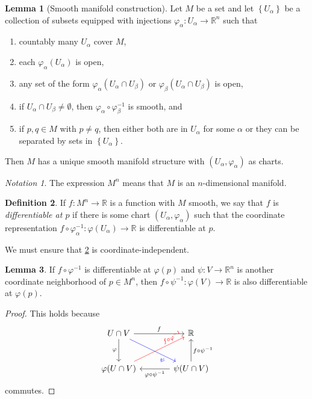 \documentclass[10pt,letterpaper,cm]{nupset}
\theoremstyle{definition}
\newtheorem{definition}{Definition}[subsection]
\theoremstyle{theorem}
\newtheorem{lemma}[definition]{Lemma}
\theoremstyle{remark}
\newtheorem*{notation}{Notation}
\newcommand{\R}{\mathbb R}
\newcommand{\1}{\mathbf{1}}
\newcommand{\0}{\vec 0}
\begin{document}
\begin{lemma}[Smooth manifold construction]\label{smc}
Let $M$ be a set and let $\left\{U_\alpha\right\}$ be a collection of subsets equipped with injections $\varphi_\alpha : U_\alpha \to \R^n$ such that
\begin{enumerate}[label=(\roman*)]
\item countably many $U_\alpha$ cover $M$,
\item each $\varphi_\alpha(U_\alpha)$ is open,
\item any set of the form $\varphi_\alpha(U_\alpha \cap U_\beta)$ or $\varphi_\beta(U_\alpha \cap U_\beta)$ is open,
\item if $U_\alpha \cap U_\beta \ne \emptyset$, then $\varphi_\alpha \circ \varphi_\beta^{-1}$ is smooth, 
and
\item if $p, q\in M$ with $p\ne q$, then either both are in $U_\alpha$ for some $\alpha$ or they can be separated by sets in $\left\{U_\alpha\right\}$.
\end{enumerate}

Then $M$ has a unique smooth manifold structure with $\left(U_\alpha, \varphi_\alpha\right)$ as charts. 
\end{lemma}

\smallskip

\begin{notation}
The expression $M^n$ means that $M$ is an $n$-dimensional manifold.
\end{notation}

\begin{definition}\label{d1}
If $f: M^n \to \R$ is a function with $M$ smooth, we say that $f$ is \textit{differentiable at $p$} if there is some chart $\left(U_\alpha, \varphi_\alpha\right)$ such that the coordinate representation $f\circ \varphi_\alpha^{-1}: \varphi(U_\alpha) \to \R$ is differentiable at $p$.
\end{definition}

We must ensure that \cref{d1} is coordinate-independent. 

\begin{lemma}
If $f \circ \varphi^{-1}$ is differentiable at $\varphi(p)$ and $\psi: V \to \R^n$ is another coordinate neighborhood of $p\in M^n$, then $f \circ \psi^{-1}: \varphi(V) \to \R$ is also differentiable at $\varphi(p)$.
\end{lemma}
\begin{proof}
This holds because
\[ \begin{tikzcd}[row sep=large, column sep=large]
U \cap V \arrow[to=Z, "\varphi", swap] \arrow[to=2-2, dr, blue, sloped,pos=.75, "\psi", swap]
& \R \\
|[alias=Z]| \varphi(U \cap V) \arrow[to=1-2, ur, red, sloped,pos=.8, "f\circ \varphi^{-1}"] 
& \psi(U \cap V)
\arrow[from=ul, to=1-2, "f"] \arrow[to=Z, "\varphi \circ \psi^{-1}"] \arrow[to=1-2, "f \circ \psi^{-1}", swap] 
\end{tikzcd}
\]
commutes.
\end{proof}
\end{document}
